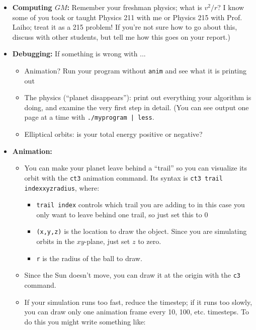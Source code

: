 \documentclass[12pt]{article}
\def\LT{\textlangle{}}
\def\RT{\textrangle{}}
\begin{document}
\begin{itemize}
\item {\bf Computing $GM$:} Remember your freshman physics; what is $v^2/r$? I know some of you 
took or taught Physics 211 with me or Physics 215 with Prof. Laiho; treat it as a 215 problem! If you're not 
sure how to go about this, discuss with other students, but tell me how this goes on your report.)

\item {\bf Debugging:} If something is wrong with ...

\begin{itemize}
\item Animation? Run your program without {\tt anim} and see what it is printing out
\item The physics (``planet disappears''): print out everything your algorithm is doing, and examine the very first step in detail. (You can see output one page at a time
with {\tt ./myprogram | less}.
\item Elliptical orbits: is your total energy positive or negative?
\end{itemize}

\item {\bf Animation:}

\begin{itemize}
\item { You can make your planet leave behind a ``trail'' so you can visualize its orbit with the {\tt ct3} animation command. Its syntax is 
     {\tt ct3 \LT trail index\RT  \LT x\RT  \LT y\RT  \LT z\RT  \LT radius\RT }, where:
\begin{itemize}
\item {\tt \LT trail index\RT} controls which trail you are adding to in this case you only want to leave behind one trail, so just set this to 0
\item {\tt \LT (x,y,z)\RT} is the location to draw the object. Since you are simulating orbits in the $xy$-plane, just set $z$ to zero.
\item {\tt \LT r\RT} is the radius of the ball to draw.
\end{itemize}
}
\item Since the Sun doesn't move, you can draw it at the origin with the {\tt c3} command.
\item If your simulation runs too fast, reduce the timestep; if it runs too slowly, you can draw only one animation frame every 10, 100, etc. timesteps.
To do this you might write something like:


\end{itemize}
\end{itemize}
\end{document}
